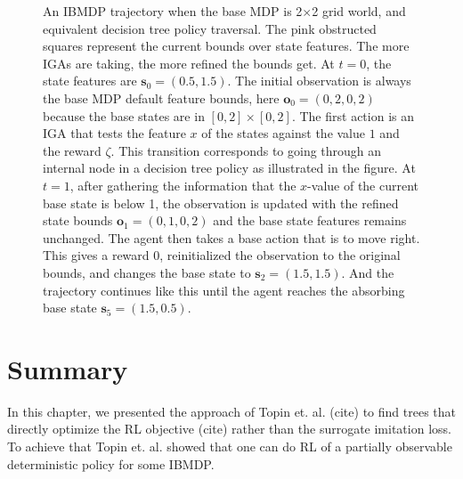 \begin{figure}[h]
\caption{An IBMDP trajectory when the base MDP is 2$\times$2 grid world, and equivalent decision tree policy traversal.
The pink obstructed squares represent the current bounds over state features. The more IGAs are taking, the more refined the bounds get.
At $t=0$, the state features are $\boldsymbol{s}_0 = (0.5, 1.5)$. 
The initial observation is always the base MDP default feature bounds, here $\boldsymbol{o}_0=(0, 2, 0, 2)$ because the base states are in $[0, 2] \times [0, 2]$.
The first action is an IGA that tests the feature $x$ of the states against the value $1$ and the reward $\zeta$. 
This transition corresponds to going through an internal node in a decision tree policy as illustrated in the figure. 
At $t=1$, after gathering the information that the $x$-value of the current base state is below 1, the observation is updated with the refined state bounds $\boldsymbol{o}_1=(0, 1, 0, 2)$ and the base state features remains unchanged. The agent then takes a base action that is to move right. 
This gives a reward 0, reinitialized the observation to the original bounds, and changes the base state to $\boldsymbol{s}_2=(1.5, 1.5)$. And the trajectory continues like this until the agent reaches the absorbing base state $\boldsymbol{s}_5=(1.5, 0.5)$.}
\label{fig:poibmdp_trajectory}
\end{figure}

\section{Summary}
In this chapter, we presented the approach of Topin et. al. (cite) to find trees that directly optimize the RL objective (cite) rather than the surrogate imitation loss.
To achieve that Topin et. al. showed that one can do RL of a partially observable deterministic policy for some IBMDP.

